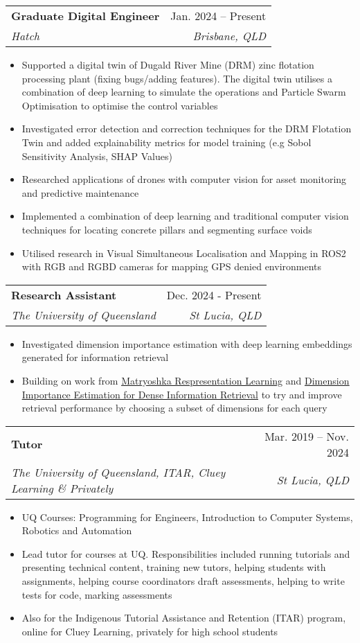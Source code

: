 \documentclass[letterpaper,11pt]{article}
\makeatletter
\newcommand{\resumeItem}[1]{
  \item\small{
    {#1 \vspace{-2pt}}
  }
}
\newcommand{\resumeSubheading}[4]{
  \vspace{-2pt}\item
  \begin{tabular*}{0.97\textwidth}[t]{l@{\extracolsep{\fill}}r}
    \textbf{#1} & #2 \\
    \textit{\small#3} & \textit{\small #4} \\
  \end{tabular*}\vspace{-7pt}
}
\newcommand{\resumeSubSubheading}[2]{
  \item
  \begin{tabular*}{0.97\textwidth}{l@{\extracolsep{\fill}}r}
    \textit{\small#1} & \textit{\small #2} \\
  \end{tabular*}\vspace{-7pt}
}
\newcommand{\resumeSubHeadingListEnd}{\end{itemize}}
\newcommand{\resumeItemListStart}{\begin{itemize}}
\newcommand{\resumeItemListEnd}{\end{itemize}\vspace{-5pt}}
\makeatother
\begin{document}
\resumeSubheading
{Graduate Digital Engineer}{Jan. 2024 -- Present}
{Hatch}{Brisbane, QLD}
\resumeItemListStart
\resumeItem{Supported a digital twin of Dugald River Mine (DRM) zinc flotation processing
  plant (fixing bugs/adding features). The digital twin utilises a combination of
  deep learning to simulate the operations and Particle Swarm Optimisation to
  optimise the control variables}
\resumeItem{Investigated error detection and correction techniques for the DRM Flotation
  Twin and added explainability metrics for model training (e.g Sobol Sensitivity
  Analysis, SHAP Values)}
\resumeItem{Researched applications of drones with computer vision for asset monitoring and
  predictive maintenance}
\resumeItem{Implemented a combination of deep learning and traditional computer vision
  techniques for locating concrete pillars and segmenting surface voids}
\resumeItem{Utilised research in Visual Simultaneous Localisation and Mapping in ROS2 with
  RGB and RGBD cameras for mapping GPS denied environments}
\resumeItemListEnd

\resumeSubheading
{Research Assistant}{Dec. 2024 - Present}
{The University of Queensland}{St Lucia, QLD}
\resumeItemListStart
\resumeItem{Investigated dimension importance estimation with deep learning embeddings
  generated for information retrieval}
\resumeItem{\sloppy Building on work from \href{https://doi.org/10.48550/arXiv.2205.13147}{\ul{Matryoshka Respresentation Learning}} and \href{https://doi.org/10.1145/3626772.3657691}{\ul{Dimension Importance Estimation for Dense Information Retrieval}}
  to try and improve retrieval performance by choosing a subset of dimensions for
  each query}
\resumeItemListEnd

\resumeSubheading
{Tutor}{Mar. 2019 -- Nov. 2024}
{The University of Queensland, ITAR, Cluey Learning \& Privately}{St Lucia, QLD}
\resumeItemListStart
\resumeItem{UQ Courses: Programming for Engineers, Introduction to Computer Systems, Robotics and Automation}
\resumeItem{Lead tutor for courses at UQ. Responsibilities included running tutorials and
  presenting technical content, training new tutors, helping students with assignments,
  helping course coordinators draft assessments, helping to write tests for code, marking assessments}
\resumeItem{Also for the Indigenous Tutorial Assistance and Retention (ITAR)
  program, online for Cluey Learning, privately for high school students}
\resumeItemListEnd
\end{document}
